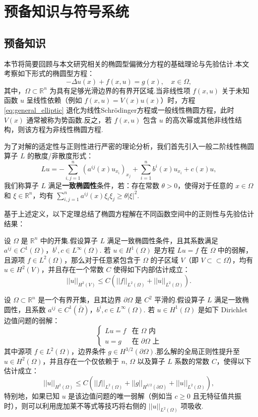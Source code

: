 \chapter{预备知识与符号系统}
\section{预备知识}
本节将简要回顾与本文研究相关的椭圆型偏微分方程的基础理论与先验估计.本文考察如下形式的椭圆型方程：
\begin{equation}\label{eq:general_elliptic}
  -\Delta u(x) + f(x, u) = g(x), \quad x \in \Omega,
\end{equation}
其中，$\Omega \subset \mathbb{R}^n$ 为具有足够光滑边界的有界开区域.当非线性项 $f(x, u)$ 关于未知函数 $u$ 呈线性依赖（例如 $f(x, u) = V(x)u(x)$）时，方程 \eqref{eq:general_elliptic} 退化为线性Schr\"{o}dinger方程或一般线性椭圆方程，此时 $V(x)$ 通常被称为势函数.反之，若 $f(x, u)$ 包含 $u$ 的高次幂或其他非线性结构，则该方程为非线性椭圆方程.

为了对解的适定性与正则性进行严密的理论分析，我们首先引入一般二阶线性椭圆算子 $L$ 的散度/非散度形式：
$$Lu = -\sum_{i,j=1}^n (a^{ij}(x) u_{x_i})_{x_j} + \sum_{i=1}^n b^i(x) u_{x_i} + c(x)u,$$
我们称算子 $L$ 满足\textbf{一致椭圆性}条件，若：存在常数 $\theta > 0$，使得对于任意的 $x \in \Omega$ 和 $\xi \in \mathbb{R}^n$，均有 $\sum_{i,j=1}^n a^{ij}(x) \xi_i \xi_j \ge \theta |\xi|^2$.

基于上述定义，以下定理总结了椭圆方程解在不同函数空间中的正则性与先验估计结果：

\begin{lemma}[椭圆方程的内部 $L^2$ 估计]\cite{evans2010partial}
设 $\Omega$ 是 $\mathbb{R}^n$ 中的开集.假设算子 $L$ 满足一致椭圆性条件，且其系数满足 $a^{ij} \in C^1(\Omega)$，$b^i, c \in L^\infty(\Omega)$.
若 $u \in H^1(\Omega)$ 是方程 $Lu = f$ 在 $\Omega$ 中的弱解，且源项 $f \in L^2(\Omega)$，那么对于任意紧包含于 $\Omega$ 的子区域 $V$（即 $V \subset\subset \Omega$），均有 $u \in H^2(V)$，并且存在一个常数 $C$ 使得如下内部估计成立：
$$||u||_{H^2(V)} \le C \left( ||f||_{L^2(\Omega)} + ||u||_{L^2(\Omega)} \right).$$
\end{lemma}

\begin{lemma}[椭圆方程的全局 $L^2$ 估计]\cite{evans2010partial}
设 $\Omega \subset \mathbb{R}^n$ 是一个有界开集，且其边界 $\partial\Omega$ 是 $C^2$ 平滑的.假设算子 $L$ 满足一致椭圆性，且系数 $a^{ij} \in C^1(\bar{\Omega})$，$b^i, c \in L^\infty(\Omega)$.
若 $u \in H^1(\Omega)$ 是如下 Dirichlet 边值问题的弱解：
$$\begin{cases} 
Lu = f & \text{在 } \Omega \text{ 内} \\ 
u = g & \text{在 } \partial\Omega \text{ 上} 
\end{cases}$$
其中源项 $f \in L^2(\Omega)$，边界条件 $g \in H^{3/2}(\partial\Omega)$.那么解的全局正则性提升至 $u \in H^2(\Omega)$，并且存在一个仅依赖于 $n$, $\Omega$ 以及算子 $L$ 系数的常数 $C$，使得以下估计成立：
$$||u||_{H^2(\Omega)} \le C \left( ||f||_{L^2(\Omega)} + ||g||_{H^{3/2}(\partial\Omega)} + ||u||_{L^2(\Omega)} \right),$$
特别地，如果已知 $u$ 是该边值问题的唯一弱解（例如当 $c \ge 0$ 且无特征值共振时），则可以利用庞加莱不等式等技巧将右侧的 $||u||_{L^2(\Omega)}$ 项吸收.
\end{lemma}

